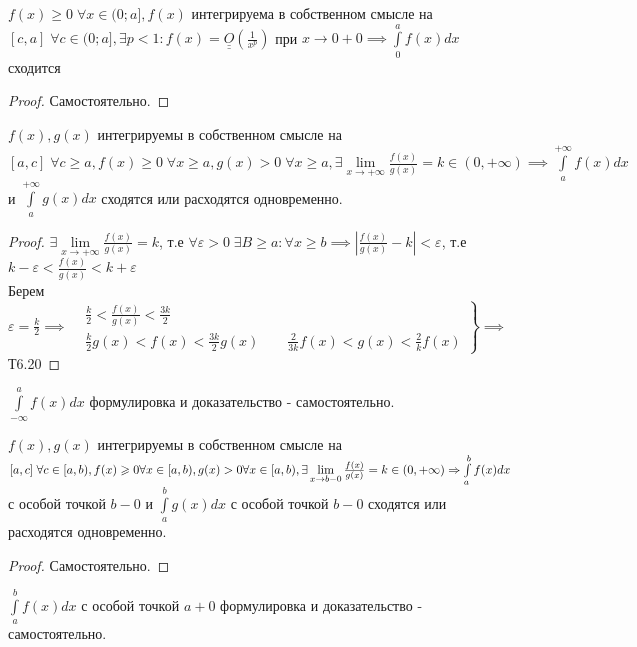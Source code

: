 \documentclass[../main.tex]{subfiles}
\begin{document}
\begin{corollary}
    $f(x)\geqslant 0 \;\forall x\in(0;a], f(x)$ интегрируема в собственном смысле на $[c,a]\; \forall c\in(0;a], \exists p<1: f(x) =\underline{\underline{O}}\left(\frac{1}{x^{p}}\right) $ при $x\to 0+0\implies \int\limits_{0}^{a} f(x)dx$ сходится 
\end{corollary}
\begin{proof}
    Самостоятельно.
\end{proof}
\begin{theorem}
    $f(x),g(x)$ интегрируемы в собственном смысле на $[a,c]\;\forall c \geqslant a, f(x)\geqslant 0 \; \forall x\geqslant a, g(x)>0 \; \forall x\geqslant a, \exists \lim\limits_{x\to +\infty}\frac{f(x)}{g(x)}=k\in(0,+\infty) \implies \int\limits_{a    }^{+\infty  } f(x)dx $ и $\int\limits_{a    }^{+\infty}  g(x)dx $ сходятся или расходятся одновременно.
\end{theorem}
\begin{proof}
    $\exists \lim\limits_{x\to +\infty}\frac{f(x)}{g(x)}=k$, т.е $\forall \varepsilon>0\; \exists B \geqslant a : \forall x \geqslant b \implies \left| \frac{f(x)}{g(x)}-k\right| <\varepsilon$, т.е $k-\varepsilon < \frac{f(x)}{g(x)}<k+\varepsilon$
    \\ Берем $\varepsilon=\frac{k}{2}\implies\left.\begin{aligned} &\frac{k}{2}<\frac{f(x)}{g(x)}<\frac{3k}{2}\\ &\frac{k}{2}g(x)< f(x)< \frac{3k}{2}g(x)\qquad \frac{2}{3k}f(x)<g(x)<\frac{2}{k}f(x)\end{aligned}\right\} \implies $ Т6.20
\end{proof}
$\int\limits_{-\infty   }^{a    } f(x)dx$ формулировка и доказательство - самостоятельно. 
 \begin{theorem}
    $f(x),g(x)$ интегрируемы в собственном смысле на $[a,c]\; \forall c\in[a,b),f(x)\geqslant 0 \forall x\in[a,b),\\ g(x) >0 \forall x \in[a,b), \exists \lim\limits_{x\to b-0}\frac{f(x)}{g(x)}=k\in(0,+\infty)\implies \int\limits_{a    }^{b    } f(x)dx$ с особой точкой $b-0$ и $\int\limits_{a   }^{b    } g(x)dx$ с особой точкой $b-0$ сходятся или расходятся одновременно. 
 \end{theorem}
\begin{proof}
    Самостоятельно. 
\end{proof}
$\int\limits_{a }^{b    } f(x)dx$ с особой точкой $a+0$ формулировка и доказательство - самостоятельно.
\end{document}
